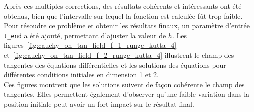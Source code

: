 \documentclass{article}
\begin{document}
Après ces multiples corrections, des résultats cohérents et intéressants ont été obtenus, bien que l'intervalle sur lequel la fonction est calculée fût trop faible. Pour résoudre ce problème et obtenir les résultats finaux, un paramètre d'entrée \texttt{t\_end} a été ajouté, permettant d'ajuster la valeur de \(h\). Les figures~\ref{fig:cauchy_on_tan_field_f_1_runge_kutta_4} et~\ref{fig:cauchy_on_tan_field_f_2_runge_kutta_4} illustrent le champ des tangentes des équations différentielles et les solutions des équations pour différentes conditions initiales en dimension 1 et 2.\\
Ces figures montrent que les solutions suivent de façon cohérente le champ des tangentes. Elles permettent également d'observer qu'une faible variation dans la position initiale peut avoir un fort impact sur le résultat final.
\end{document}
